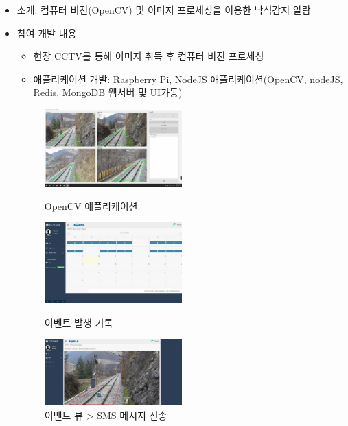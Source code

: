 \divider



\begin{itemize}
	\item
	      소개: 컴퓨터 비젼(OpenCV) 및 이미지 프로세싱을 이용한 낙석감지 알람
	\item 참여 개발 내용
	      \begin{itemize}
		      \item 현장 CCTV를 통해 이미지 취득 후 컴퓨터 비젼 프로세싱
		      \item 애플리케이션 개발: Raspberry Pi, NodeJS 애플리케이션(OpenCV, nodeJS, Redis, MongoDB 웹서버 및 UI가동)
	      \end{itemize}
	      \begin{figure}[!ht]
		      \begin{fullwidth}
			      \parbox{0.5\textwidth}{
				      \centering
				      \includegraphics[width=0.5\textwidth]{images/korail_aod_01.jpg}
				      \caption*{OpenCV 애플리케이션}
			      }\qquad
			      \parbox{0.5\textwidth}{
				      \centering
				      \includegraphics[width=0.5\textwidth]{images/korail_aod_02.jpg}
				      \caption*{이벤트 발생 기록}
			      }\qquad
			      \parbox{0.5\textwidth}{
				      \centering
				      \includegraphics[width=0.5\textwidth]{images/korail_aod_03_01.png}
				      \caption*{이벤트 뷰 > SMS 메시지 전송}
			      }
		      \end{fullwidth}
	      \end{figure}


\end{itemize}
